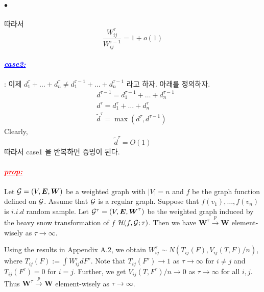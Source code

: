 \documentclass[12pt,oneside,english,a4paper]{article}
\def\ck{\paragraph{\LARGE$\bullet$}\LARGE}
\newcommand{\parablue}[1]{\paragraph{\LARGE\textcolor{blue}{\it\underline{\textbf{#1:}}}}\LARGE}
\newcommand{\parared}[1]{\paragraph{\LARGE\textcolor{red}{\it\underline{\textbf{#1:}}}}\LARGE}
\begin{document}
\ck 따라서 
\[
\frac{W_{ij}^{\tau}}{W_{ij}^{\tau-1}}
=1+o(1)
\]

\parablue{case2} :  이제 $d_1^{\tau}+\dots+d_n^{\tau}\neq d_1^{\tau-1}+\dots+d_n^{\tau-1}$ 라고 하자. 아래를 정의하자. 
\begin{align*}
&d^{\tau-1}=d_1^{\tau-1}+\dots+d_n^{\tau-1} \\
&d^{\tau}=d_1^{\tau}+\dots+d_n^{\tau} \\
& \tilde{d}^{\tau}=\max(d^{\tau},d^{\tau-1})
\end{align*}
Clearly,
\[
\tilde{d}^{\tau}=O(1)
\]
따라서 case1 을 반복하면 증명이 된다. 



\parared{prop} Let ${\cal G}=(V,{\boldsymbol E},{\boldsymbol W})$ be a weighted graph with $|V|=n$ and $f$ be the graph function defined on ${\cal G}$. Assume that ${\cal G}$ is a regular graph. Suppose that $f(v_1),\dots,f(v_n)$ is $i.i.d$ random sample. Let ${\cal G}^{\tau}=(V,{\boldsymbol E},{\boldsymbol W}^{\tau})$ be the weighted graph induced by the heavy snow transformation of $f$ ${\cal H}(f,{\cal G}; \tau)$. Then we have ${\boldsymbol W}^{\tau} \overset{p}{\to} {\boldsymbol W}$ element-wisely as $\tau \to \infty$.

\proof Using the results in Appendix A.2, we obtain $W_{ij}^{\tau} \sim N(T_{ij}(F),V_{ij}(T,F)/n)$, where $T_{ij}(F):=\int W_{ij}^{\tau}dF^{\tau}$. Note that $T_{ij}(F^{\tau}) \to 1 $ as $\tau \to \infty$ for $i\neq j$ and $T_{ij}(F^{\tau})=0$ for $i=j$. Further, we get $V_{ij}(T,F^{\tau})/n \to 0$ as $\tau \to \infty$ for all $i,j$. Thus ${\boldsymbol W}^{\tau} \overset{p}{\to} {\boldsymbol W}$ element-wisely as $\tau \to \infty$.
\end{document}
